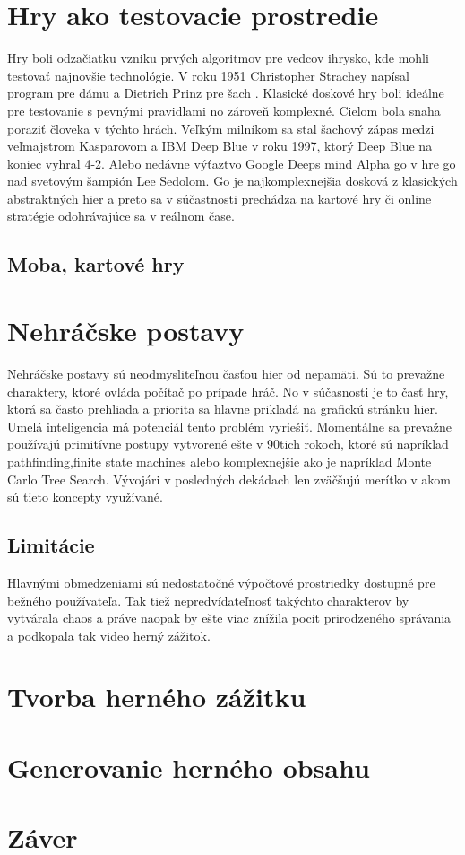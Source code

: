 \documentclass{article}
\begin{document}
\clearpage

\section{Hry ako testovacie prostredie}

Hry boli odzačiatku vzniku prvých algoritmov pre vedcov ihrysko, kde mohli testovať najnovšie technológie. V roku 1951 Christopher Strachey  napísal program pre dámu a Dietrich Prinz pre šach \cite{Copeland}. Klasické doskové hry boli ideálne pre testovanie s pevnými pravidlami no zároveň komplexné. Cielom bola snaha poraziť človeka v týchto hrách. Veľkým milníkom sa stal šachový zápas medzi veľmajstrom Kasparovom a IBM Deep Blue v roku 1997, ktorý Deep Blue na koniec vyhral 4-2. Alebo nedávne výťaztvo Google Deeps mind Alpha go v hre go nad svetovým šampión Lee Sedolom. Go je najkomplexnejšia dosková z klasických abstraktných hier a preto sa v súčastnosti prechádza na kartové hry či online stratégie odohrávajúce sa v reálnom čase.

\subsection{Moba, kartové hry}

\section{Nehráčske postavy}

Nehráčske postavy sú neodmysliteľnou časťou hier od nepamäti. Sú to prevažne charaktery, ktoré ovláda počítač po prípade hráč. No v súčasnosti je to časť hry, ktorá sa často prehliada a priorita sa hlavne prikladá na grafickú stránku hier. Umelá inteligencia má potenciál tento problém vyriešiť. Momentálne sa prevažne používajú primitívne postupy vytvorené ešte v 90tich rokoch, ktoré sú napríklad pathfinding,finite state machines alebo komplexnejšie ako je napríklad Monte Carlo Tree Search\cite{nickstatt}. Vývojári v posledných dekádach len zväčšujú merítko v akom sú tieto koncepty využívané.

\subsection{Limitácie}

Hlavnými obmedzeniami sú nedostatočné výpočtové prostriedky dostupné pre bežného používateľa. Tak tiež nepredvídateľnosť takýchto charakterov by vytvárala chaos a práve naopak by ešte viac znížila pocit prirodzeného správania a podkopala tak video herný zážitok\cite{phdthesis}.

\section{Tvorba herného zážitku}

\section{Generovanie herného obsahu}
\section{Záver}



\end{document}
